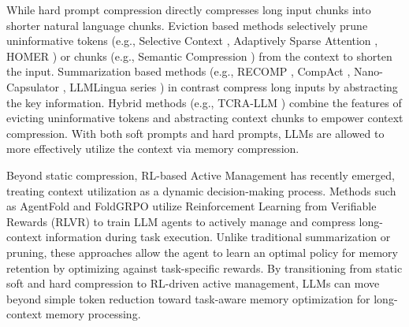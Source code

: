 \documentclass[manuscript,screen]{acmart}
\begin{document}

While hard prompt compression directly compresses long input chunks into shorter natural language chunks. Eviction based methods selectively prune uninformative tokens (e.g., Selective Context \citep{li-etal-2023-compressing}, Adaptively Sparse Attention \citep{NEURIPS2023_cdaac2a0}, HOMER \citep{song2024hierarchical}) or chunks (e.g., Semantic Compression \citep{fei-etal-2024-extending}) from the context to shorten the input. Summarization based methods (e.g., RECOMP \citep{xu2024recomp}, CompAct \citep{yoon-etal-2024-compact}, Nano-Capsulator \citep{chuang-etal-2024-learning}, LLMLingua series \citep{jiang-etal-2023-llmlingua, jiang-etal-2024-longllmlingua, pan-etal-2024-llmlingua}) in contrast compress long inputs by abstracting the key information. Hybrid methods (e.g., TCRA-LLM \citep{liu-etal-2023-tcra}) combine the features of evicting uninformative tokens and abstracting context chunks to empower context compression. With both soft prompts and hard prompts, LLMs are allowed to more effectively utilize the context via memory compression.

Beyond static compression, RL-based Active Management has recently emerged, treating context utilization as a dynamic decision-making process. Methods such as AgentFold \citep{ye2025agentfoldlonghorizonwebagents} and FoldGRPO \citep{sun2025scalinglonghorizonllmagent} utilize Reinforcement Learning from Verifiable Rewards (RLVR) to train LLM agents to actively manage and compress long-context information during task execution. Unlike traditional summarization or pruning, these approaches allow the agent to learn an optimal policy for memory retention by optimizing against task-specific rewards. By transitioning from static soft and hard compression to RL-driven active management, LLMs can move beyond simple token reduction toward task-aware memory optimization for long-context memory processing.
\end{document}

